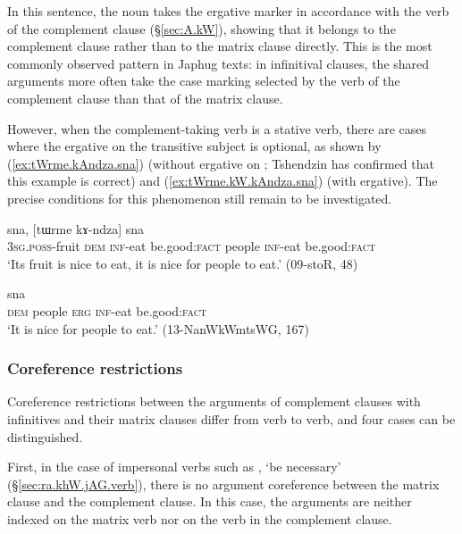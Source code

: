In this sentence, the noun takes the ergative marker  in accordance with the verb of the complement clause (§\ref{sec:A.kW}), showing that it belongs to the complement clause rather than to the matrix clause directly. This is the most commonly observed pattern in Japhug texts: in infinitival clauses, the shared arguments more often take the case marking selected by the verb of the complement clause than that of the matrix clause.

However, when the complement-taking verb is a stative verb, there are cases where the ergative on the transitive subject is optional, as shown by (\ref{ex:tWrme.kAndza.sna}) (without ergative on ; Tshendzin has confirmed that this example is correct) and (\ref{ex:tWrme.kW.kAndza.sna}) (with ergative). The precise conditions for this phenomenon still remain to be investigated.

\begin{exe}
\ex \label{ex:tWrme.kAndza.sna}
 sna, [tɯrme kɤ-ndza] sna \\
\textsc{3sg}.\textsc{poss}-fruit \textsc{dem} \textsc{inf}-eat be.good:\textsc{fact} people \textsc{inf}-eat be.good:\textsc{fact} \\
\glt `Its fruit is nice to eat, it is nice for people to eat.' (09-stoR, 48)
\end{exe}

\begin{exe}
\ex \label{ex:tWrme.kW.kAndza.sna}
 sna \\
\textsc{dem} people \textsc{erg} \textsc{inf}-eat be.good:\textsc{fact} \\
\glt `It is nice for people to eat.' (13-NanWkWmtsWG, 167)
\end{exe}

\subsubsection{Coreference restrictions} \label{sec:velar.inf.coreference}
Coreference restrictions between the arguments of complement clauses with  infinitives and their matrix clauses differ from verb to verb, and four cases can be distinguished.

First, in the case of impersonal verbs such as , `be necessary' (§\ref{sec:ra.khW.jAG.verb}), there is no argument coreference between the matrix clause and the complement clause. In this case, the arguments are neither indexed on the matrix verb nor on the verb in the complement clause.

